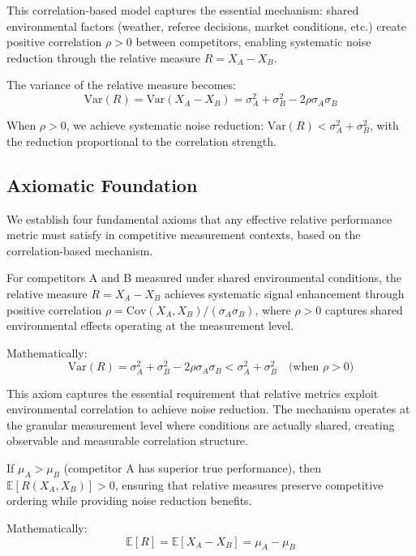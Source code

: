 This correlation-based model captures the essential mechanism: shared environmental factors (weather, referee decisions, market conditions, etc.) create positive correlation $\rho > 0$ between competitors, enabling systematic noise reduction through the relative measure $R = X_A - X_B$.

The variance of the relative measure becomes:
\begin{equation}
\text{Var}(R) = \text{Var}(X_A - X_B) = \sigma_A^2 + \sigma_B^2 - 2\rho\sigma_A\sigma_B \label{eq:relative_variance}
\end{equation}

When $\rho > 0$, we achieve systematic noise reduction: $\text{Var}(R) < \sigma_A^2 + \sigma_B^2$, with the reduction proportional to the correlation strength.

\subsection{Axiomatic Foundation}

We establish four fundamental axioms that any effective relative performance metric must satisfy in competitive measurement contexts, based on the correlation-based mechanism.

\begin{axiom}
For competitors A and B measured under shared environmental conditions, the relative measure $R = X_A - X_B$ achieves systematic signal enhancement through positive correlation $\rho = \text{Cov}(X_A, X_B)/(\sigma_A \sigma_B)$, where $\rho > 0$ captures shared environmental effects operating at the measurement level.

Mathematically:
$$\text{Var}(R) = \sigma_A^2 + \sigma_B^2 - 2\rho\sigma_A \sigma_B < \sigma_A^2 + \sigma_B^2 \quad \text{(when } \rho > 0\text{)}$$
\end{axiom}

This axiom captures the essential requirement that relative metrics exploit environmental correlation to achieve noise reduction. The mechanism operates at the granular measurement level where conditions are actually shared, creating observable and measurable correlation structure.

\begin{axiom} 
If $\mu_A > \mu_B$ (competitor A has superior true performance), then $\mathbb{E}[R(X_A, X_B)] > 0$, ensuring that relative measures preserve competitive ordering while providing noise reduction benefits.

Mathematically:
$$\mathbb{E}[R] = \mathbb{E}[X_A - X_B] = \mu_A - \mu_B$$
\end{axiom}

